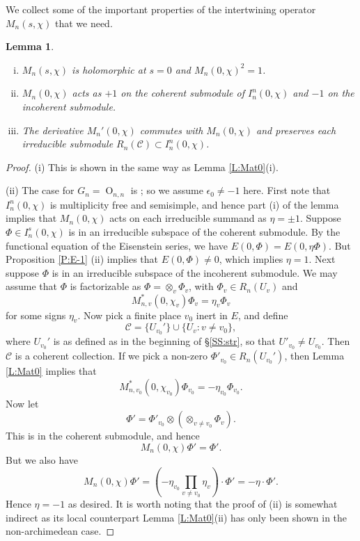 \documentclass[10pt]{amsart}
\theoremstyle{plain}
\newtheorem{Lem}[equation]{Lemma}
\numberwithin{equation}{section}
\begin{document}
 We collect some of the important properties of the intertwining
 operator $M_n(s,\chi)$ that we need.
 \begin{Lem} \label{L:Mat02}
\begin{enumerate}[(i)]
\item $M_n(s,\chi)$ is holomorphic at $s =0$ and $M_n(0,\chi)^2  =1$.
\item $M_n(0,\chi)$ acts as $+1$ on the coherent submodule of
  $I_n^n(0,\chi)$ and $-1$ on the incoherent submodule.
\item The derivative $M_n'(0,\chi)$ commutes with $M_n(0,\chi)$ and
  preserves each irreducible submodule $R_n(\mathcal{C}) \subset
  I_n^n(0,\chi)$.
\end{enumerate}
\end{Lem}
\begin{proof}
(i) This is shown in the same way as  Lemma \ref{L:Mat0}(i).  
\vskip 5pt

(ii) The case for $G_n={\operatorname{O}}_{n,n}$ is \cite[Lemma 7.4 (i)]{GT}; so we assume $\epsilon_0 \ne -1$ here. First note that $I_n^n(0,\chi)$ is multiplicity free and
  semisimple, and hence part (i) of the lemma implies that $M_n(0,\chi)$
  acts on each irreducible summand as $\eta=\pm1$. Suppose
  $\Phi\in I_n^s(0,\chi)$ is in an irreducible subspace of the
  coherent submodule. By the functional equation of the Eisenstein
  series, we have $E(0, \Phi)=E(0, \eta\Phi)$. But Proposition
  \ref{P:E-1} (ii) implies that $E(0, \Phi)\neq 0$, which implies
  $\eta=1$. Next suppose $\Phi$ is in an irreducible subspace of
  the incoherent submodule. We may assume that $\Phi$ is factorizable as
  $\Phi=\otimes_v\Phi_v$, with $\Phi_v\in R_n(U_v)$ and
     \[ M_{n,v}^*(0,\chi_v) \Phi_{v} = \eta_{v} \Phi_{v} \]
  for some signs $\eta_v$.
  Now pick a  finite place $v_0$ inert in $E$, and define
  \[  \mathcal{C}=\{U_{v_0}'\}\cup \{U_v: v \ne v_0 \},\]
   where
  $U_{v_0}'$ is as defined as in the beginning of \S \ref{SS:str}, so that $U'_{v_0} \ne U_{v_0}$. 
  Then $\mathcal{C}$ is a coherent collection. If we pick a non-zero
  $\Phi'_{v_0}\in R_n(U_{v_0}')$, then Lemma \ref{L:Mat0} implies that
  \[ M_{n,v_0}^*(0,\chi_{v_0}) \Phi_{v_0} = -\eta_{v_0} \Phi_{v_0}. \]
  Now let
  \[ \Phi'=\Phi'_{v_0} \otimes (\otimes_{v\neq v_0}\Phi_v). \] 
  This is in the coherent submodule, and hence 
  \[  M_n(0,\chi) \Phi' = \Phi'. \] 
  But we also have
  \[ M_n(0,\chi) \Phi' = \left( -\eta_{v_0}\prod_{v\neq v_0}\eta_v \right) \cdot \Phi' = -\eta \cdot \Phi'. \] 
Hence $\eta=-1$ as desired. It is worth noting that the proof of (ii)
is somewhat indirect as its local counterpart Lemma \ref{L:Mat0}(ii)
has only been shown in the non-archimedean case. 
\vskip 5pt


\end{proof}
\end{document}
